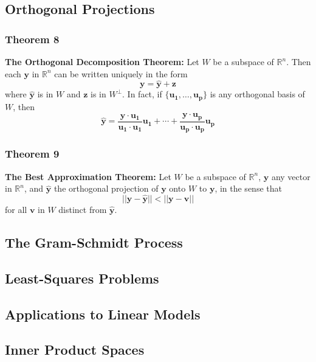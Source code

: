 \documentclass[letterpaper,11pt]{article}
\begin{document}
		\subsection{Orthogonal Projections}
			\subsubsection{Theorem 8}
				\textbf{The Orthogonal Decomposition Theorem:} Let $W$ be a subspace of $\mathbb{R}^n$. Then each $\mathbf{y}$ in $\mathbb{R}^n$ can be written uniquely in the form
				\begin{equation}
					\mathbf{y=\hat{y}+z}
				\end{equation}
				where $\mathbf{\hat{y}}$ is in $W$ and $\mathbf{z}$ is in $W^\bot$. In fact, if $\{\mathbf{\mathbf{u}_1,\dots,\mathbf{u}_p}\}$ is any orthogonal basis of $W$, then
				\begin{equation}
					\mathbf{\hat{y}=\frac{y\cdot u_1}{u_1\cdot u_1}u_1+\cdots+\frac{y\cdot u_p}{u_p\cdot u_p}u_p}
				\end{equation}
			\subsubsection{Theorem 9}
				\textbf{The Best Approximation Theorem:} Let $W$ be a subspace of $\mathbb{R}^n$, $\mathbf{y}$ any vector in $\mathbb{R}^n$, and $\mathbf{\hat{y}}$ the orthogonal projection of $\mathbf{y}$ onto $W$ to $\mathbf{y}$, in the sense that
				\begin{equation}
					\mathbf{||y-\hat{y}||<||y-v||}
				\end{equation}
				for all $\mathbf{v}$ in $W$ distinct from $\mathbf{\hat{y}}$.
		\subsection{The Gram-Schmidt Process}
		\subsection{Least-Squares Problems}
		\subsection{Applications to Linear Models}
		\subsection{Inner Product Spaces}
\end{document}
